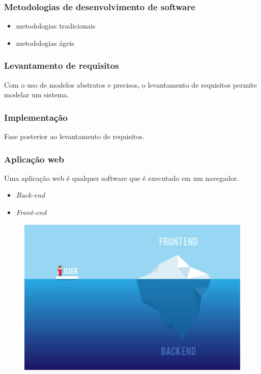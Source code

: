 \documentclass{beamer}
\begin{document}
	\begin{frame}\frametitle{Metodologias de desenvolvimento de software}		
		\begin{itemize}
			\item metodologias tradicionais
			\item metodologias ágeis
		\end{itemize}
	\end{frame}

	\begin{frame}\frametitle{Levantamento de requisitos}
		Com o uso de modelos abstratos e precisos, o levantamento de requisitos
		permite modelar um sistema.
	\end{frame}
	\begin{frame}\frametitle{Implementação}
		Fase posterior ao levantamento de requisitos.
	\end{frame}


	\begin{frame}\frametitle{Aplicação web}
		Uma aplicação web é qualquer software que é executado em um navegador.
		\begin{itemize}
			\item \textit{Back-end}
			\item \textit{Front-end}
		\end{itemize}
		\begin{figure}[ht]
			\centering
			\includegraphics[scale=0.11]{img/front-back.jpg}
		\end{figure}
	\end{frame}
\end{document}
